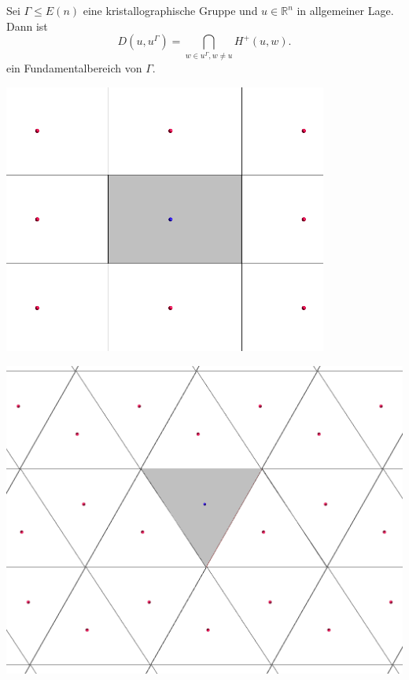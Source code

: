 \documentclass{beamer}
\theoremstyle{plain}
\newcommand\R{\mathbb R}
\begin{document}
\begin{frame}
    \begin{theorem}
        Sei $\Gamma \leq E(n)$ eine kristallographische Gruppe und $u \in \R^n$ in allgemeiner Lage. Dann ist 
        $$
            D(u, u^\Gamma) = \bigcap_{w \in u^\Gamma, w \neq u} H^+(u, w).
        $$ 
        ein Fundamentalbereich von $\Gamma$.
    \end{theorem}
\end{frame}

\begin{frame}
    \centering
    \includegraphics[width=0.8\textwidth]{images/dirichlet-example.png}
\end{frame}

\begin{frame}
    \centering
    \includegraphics[width=\textwidth]{images/p2-hex-dirichlet.png}
\end{frame}
\end{document}
